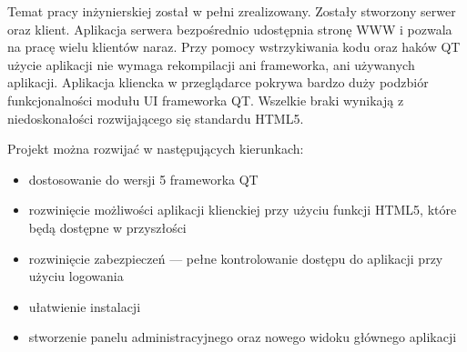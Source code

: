Temat pracy inżynierskiej został w pełni zrealizowany. Zostały stworzony serwer oraz klient. Aplikacja serwera bezpośrednio udostępnia stronę WWW i pozwala na pracę wielu klientów naraz. Przy pomocy wstrzykiwania kodu oraz haków QT użycie aplikacji nie wymaga rekompilacji ani frameworka, ani używanych aplikacji.
Aplikacja kliencka w przeglądarce pokrywa bardzo duży podzbiór funkcjonalności modułu UI frameworka QT. Wszelkie braki wynikają z niedoskonałości rozwijającego się standardu HTML5.

Projekt można rozwijać w następujących kierunkach:
\begin{itemize}
  \item dostosowanie do wersji 5 frameworka QT
  \item rozwinięcie możliwości aplikacji klienckiej przy użyciu funkcji HTML5, które będą dostępne w przyszłości
  \item rozwinięcie zabezpieczeń --- pełne kontrolowanie dostępu do aplikacji przy użyciu logowania
  \item ułatwienie instalacji
  \item stworzenie panelu administracyjnego oraz nowego widoku głównego aplikacji
\end{itemize}
